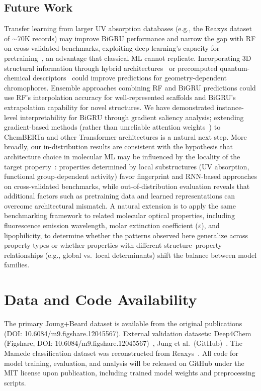 \documentclass[11pt,a4paper]{article}
\begin{document}
\subsection*{Future Work}
Transfer learning from larger UV absorption databases (e.g., the Reaxys dataset of $\sim$70K records) may improve BiGRU performance and narrow the gap with RF on cross-validated benchmarks, exploiting deep learning's capacity for pretraining~\cite{vermeire2021transfer}, an advantage that classical ML cannot replicate.
Incorporating 3D structural information through hybrid architectures~\cite{gilmer2017neural} or precomputed quantum-chemical descriptors~\cite{lupopasini2023excited} could improve predictions for geometry-dependent chromophores.
Ensemble approaches combining RF and BiGRU predictions could use RF's interpolation accuracy for well-represented scaffolds and BiGRU's extrapolation capability for novel structures.
We have demonstrated instance-level interpretability for BiGRU through gradient saliency analysis; extending gradient-based methods (rather than unreliable attention weights~\cite{jain2019attention}) to ChemBERTa and other Transformer architectures is a natural next step.
More broadly, our in-distribution results are consistent with the hypothesis that architecture choice in molecular ML may be influenced by the locality of the target property~\cite{chenMolecularLanguage2023, jiang2023trangru}: properties determined by local substructures (UV absorption, functional group-dependent activity) favor fingerprint and RNN-based approaches on cross-validated benchmarks, while out-of-distribution evaluation reveals that additional factors such as pretraining data and learned representations can overcome architectural mismatch.
A natural extension is to apply the same benchmarking framework to related molecular optical properties, including fluorescence emission wavelength, molar extinction coefficient ($\varepsilon$), and lipophilicity, to determine whether the patterns observed here generalize across property types or whether properties with different structure--property relationships (e.g., global vs.\ local determinants) shift the balance between model families.


\section*{Data and Code Availability}
The primary Joung+Beard dataset is available from the original publications~\cite{joung2020experimental, beard2019comparative} (DOI: 10.6084/m9.figshare.12045567).
External validation datasets: Deep4Chem (Figshare, DOI: 10.6084/m9.figshare.12045567)~\cite{joung2020experimental}, Jung et al.\ (GitHub)~\cite{jung2024machine}.
The Mamede classification dataset was reconstructed from Reaxys~\cite{mamede2021machine}.
All code for model training, evaluation, and analysis will be released on GitHub under the MIT license upon publication, including trained model weights and preprocessing scripts.
\end{document}
